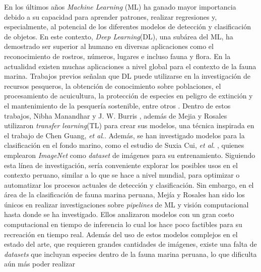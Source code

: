 
En los últimos años \textit{Machine Learning} (ML) ha ganado  
mayor importancia debido a su capacidad para aprender patrones, 
realizar regresiones y, especialmente, al potencial de los diferentes 
modelos de detección y clasificación de objetos. En este contexto, \textit{Deep Learning}(DL), 
una subárea del ML, ha demostrado ser superior al humano en diversas 
aplicaciones como el reconocimiento de rostros, números, lugares e incluso fauna y flora.
\newline
\newline
En la actualidad existen muchas aplicaciones a nivel global para el contexto de 
la fauna marina. Trabajos previos señalan que DL puede utilizarse 
en la investigación de recursos pesqueros, la obtención de conocimiento 
sobre poblaciones, el procesamiento de acuicultura, la protección de 
especies en peligro de extinción y el mantenimiento de la pesquería 
sostenible, entre otros 
\cite{10.1145/3419635.3419643, 10.1145/3325917.3325934,20.500.12724/11174,8371919}.
\newline
\newline
Dentro de estos trabajos, Nibha Manandhar y J. W. Burris 
\cite{10.1145/3325917.3325934}, además de Mejia y Rosales 
\cite{20.500.12724/11174} utilizaron \textit{transfer learning}(TL) 
para crear sus modelos, una técnica inspirada en el trabajo de Chen Guang, 
\textit{et al}.\cite{8371919}. Además, se han investigado modelos para la 
clasificación en el fondo marino, como el estudio de Suxia Cui, 
\textit{et al}. \cite{Cui2020}, quienes emplearon \textit{ImageNet}\cite{ImageNet} como 
\textit{dataset} de imágenes para su entrenamiento. 
\newline
\newline
Siguiendo esta línea de investigación, sería conveniente explorar 
los posibles usos en el contexto peruano, similar a lo que se hace a nivel 
mundial, para optimizar o automatizar los procesos actuales de detección y 
clasificación. Sin embargo, en el área de la clasificación de fauna marina 
peruana, Mejía y Rosales \cite{20.500.12724/11174} han sido los únicos en 
realizar investigaciones sobre \textit{pipelines} de ML y visión 
computacional hasta donde se ha investigado. Ellos analizaron modelos con 
un gran costo computacional en tiempo de inferencia lo cual los hace poco 
factibles para su recreación en tiempo real. Además del uso de estos 
modelos complejos en el estado del arte, que requieren grandes cantidades 
de imágenes, existe una falta de \textit{datasets} que incluyan especies 
dentro de la fauna marina peruana, lo que dificulta aún más poder realizar 
